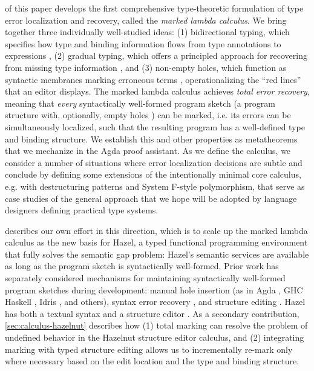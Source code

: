  of this paper develops the first comprehensive {type-theoretic formulation} of type error localization and recovery, called the \emph{marked lambda calculus}.
We bring together three individually well-studied ideas: (1) bidirectional typing, which specifies how type and binding information flows from 
type annotations to expressions \cite{Localinf,BidirTyping}, (2) gradual typing, which offers a principled approach for recovering from missing type information \cite{Siek06a,siek2015refined}, and 
(3) non-empty holes, which function as syntactic membranes marking erroneous terms \cite{HazelnutPOPL}, operationalizing the ``red lines'' that an editor displays.
The marked lambda calculus achieves \emph{total error recovery}, meaning that \emph{every} syntactically well-formed program sketch (a program structure with, optionally, empty holes \cite{solar2013program}) can be marked, i.e. its errors can be simultaneously localized, such that the resulting program has a well-defined type and binding structure.
We establish this and other properties as metatheorems that we mechanize in the Agda proof assistant. 
As we define the calculus, we consider a number of situations where error localization decisions are subtle and conclude by defining some extensions of the intentionally minimal core calculus, e.g. with destructuring patterns and System F-style polymorphism, 
that serve as case studies of the general approach that we hope will be adopted by language designers defining practical type systems.

 describes our own effort in this direction, which is to scale up the marked lambda calculus as the new basis for Hazel, a typed functional programming environment that fully solves the semantic gap problem: Hazel's semantic services are available as long as the program sketch is syntactically well-formed. Prior work has separately considered mechanisms for maintaining syntactically well-formed program sketches during development: manual hole insertion (as in Agda \cite{norell:thesis}, GHC Haskell \cite{haskell-holes}, Idris \cite{DBLP:journals/jfp/Brady13}, and others), syntax error recovery \cite{medeiros20,sorkin11}, and structure editing \cite{HazelnutPOPL,teitelbaum_cornell_1981}. 
Hazel has both a textual syntax and a structure editor \cite{HazelnutPOPL,DBLP:conf/vl/Moon023}. 
As a secondary contribution, 
\cref{sec:calculus-hazelnut} describes how (1)  total marking can resolve the problem of undefined behavior in the Hazelnut structure editor calculus, 
and (2) integrating marking with typed structure editing allows us to incrementally re-mark only where necessary based on the edit location and the type and binding structure.

